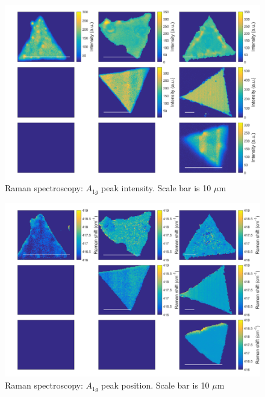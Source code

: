 \documentclass[12pt]{article}
\begin{document}
\begin{figure}[h]
\begin{center}
\includegraphics[scale=0.3]{PaperSIMapsIntensityA.png}
\caption{Raman spectroscopy: $A_{1g}$ peak intensity. Scale bar is 10 $\mu$m}
\label{fig:PaperSIMapsIntensityA}
\end{center}
\end{figure}

\begin{figure}[h]
\begin{center}
\includegraphics[scale=0.3]{PaperSIMapsPositionA.png}
\caption{Raman spectroscopy: $A_{1g}$ peak position. Scale bar is 10 $\mu$m}
\label{fig:PaperSIMapsPositionA}
\end{center}
\end{figure}
\end{document}
